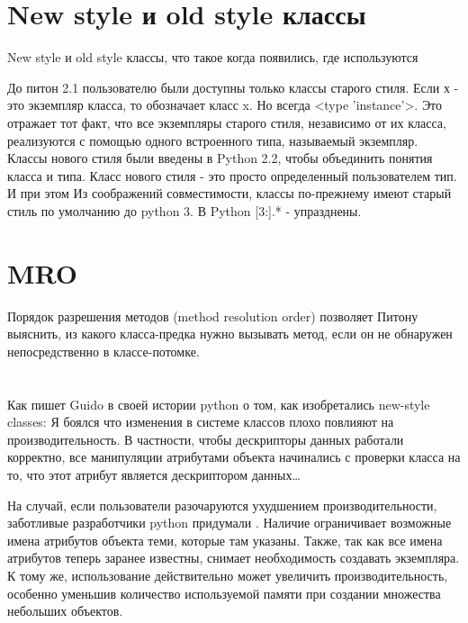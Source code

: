 \section{New style и old style классы}

New style и old style классы, что такое когда появились, где используются

До питон 2.1 пользователю были доступны только классы старого стиля. Если х - это экземпляр класса, то  обозначает класс x. Но  всегда <type 'instance'>. Это отражает тот факт, что все экземпляры старого стиля, независимо от их класса, реализуются с помощью одного встроенного типа, называемый экземпляр.
Классы нового стиля были введены в Python 2.2, чтобы объединить понятия класса и типа. Класс нового стиля - это просто определенный пользователем тип. И при этом 
Из соображений совместимости, классы по-прежнему имеют старый стиль по умолчанию до python 3. В Python [3:].* - упразднены. 
	
\section{MRO}

Порядок разрешения методов (method resolution order) позволяет Питону выяснить, из какого класса-предка нужно вызывать метод, если он не обнаружен непосредственно в классе-потомке. 

\section{}

Как пишет Guido в своей истории python о том, как изобретались new-style classes:
	Я боялся что изменения в системе классов плохо повлияют на производительность. В частности, чтобы дескрипторы данных работали корректно, все манипуляции атрибутами объекта начинались с проверки  класса на то, что этот атрибут является дескриптором данных…
	
	На случай, если пользователи разочаруются ухудшением производительности, заботливые разработчики python придумали .
	Наличие  ограничивает возможные имена атрибутов объекта теми, которые там указаны. Также, так как все имена атрибутов теперь заранее известны, снимает необходимость создавать  экземпляра.
	К тому же, использование  действительно может увеличить производительность, особенно уменьшив количество используемой памяти при создании множества небольших объектов.
	
